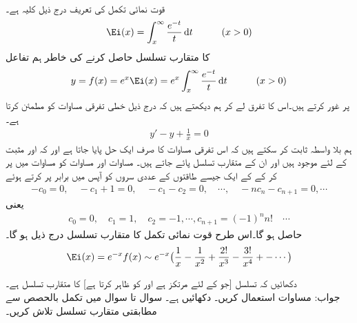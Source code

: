 \quad {}\\
قوت نمائی تکمل  کی تعریف درج ذیل کلیہ ہے۔
\begin{align*}
\Ei(x)=\int_{x}^{\infty} \frac{e^{-t}}{t}\dif t\quad \quad\quad (x>0)
\end{align*} 
 کا متقارب تسلسل حاصل کرنے کی خاطر ہم تفاعل
\begin{align*}
y=f(x)=e^x\Ei(x)=e^x\int_{x}^{\infty} \frac{e^{-t}}{t}\dif t\quad\quad \quad (x>0)
\end{align*}
پر غور کرتے ہیں۔اس کا تفرق لے کر ہم دیکھتے ہیں کہ  درج ذیل خطی تفرقی مساوات کو مطمئن کرتا ہے۔
\begin{align}\label{مساوات_اعدادی_جزو_دو_جزو_تفرق_ح}
y'-y+\frac{1}{x}=0
\end{align}
ہم بلا واسطہ ثابت کر سکتے ہیں کہ اس تفرقی مساوات کا صرف ایک حل  پایا جاتا ہے اور کہ   اور  مثبت  کے لئے موجود ہیں اور ان  کے متقارب تسلسل پائے جاتے ہیں۔ مساوات  اور مساوات  کو مساوات  میں پر کر کے  کے ایک جیسے طاقتوں کے عددی سروں کو آپس میں برابر پر کرتے ہوئے 
\begin{align*}
-c_0=0,\quad -c_1+1=0,\quad -c_1-c_2=0,\quad \cdots,\quad -nc_n-c_{n+1}=0,\cdots
\end{align*}
یعنی
\begin{align*}
c_0=0,\quad c_1=1,\quad c_2=-1,\cdots, c_{n+1}=(-1)^nn! \quad \cdots
\end{align*}
حاصل ہو گا۔اس طرح قوت نمائی تکمل کا متقارب تسلسل درج ذیل ہو  گا۔
\begin{align}\label{مساوات_اعدادی_جزو_دو_جزو_تفرق_خ}
\Ei(x)=e^{-x}f(x)\sim e^{-x}\big(\frac{1}{x}-\frac{1}{x^2}+\frac{2!}{x^3}-\frac{3!}{x^4}+-\cdots\big)
\end{align}

\quad
دکھائیں کہ تسلسل  [جو  کے لئے مرتکز ہے اور  کو ظاہر کرتا ہے]  کا متقارب تسلسل ہے۔\\
جواب:\quad
مساوات  استعمال کریں۔
\quad
دکھائیں  ہے۔
سوال  تا سوال  میں تکمل بالحصص سے مطابقتی متقارب تسلسل تلاش کریں۔

